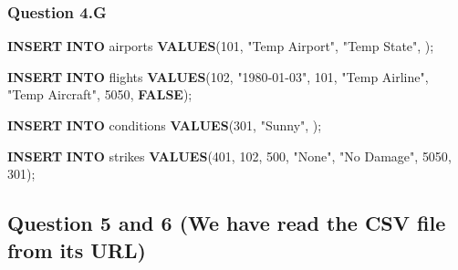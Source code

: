 \documentclass[
]{article}
\newenvironment{Shaded}{\begin{snugshade}}{\end{snugshade}}
\newcommand{\DecValTok}[1]{\textcolor[rgb]{0.00,0.00,0.81}{#1}}
\newcommand{\KeywordTok}[1]{\textcolor[rgb]{0.13,0.29,0.53}{\textbf{#1}}}
\newcommand{\NormalTok}[1]{#1}
\newcommand{\OtherTok}[1]{\textcolor[rgb]{0.56,0.35,0.01}{#1}}
\newcommand{\StringTok}[1]{\textcolor[rgb]{0.31,0.60,0.02}{#1}}
\begin{document}
\hypertarget{question-4.g}{%
\subsubsection{Question 4.G}\label{question-4.g}}

\begin{Shaded}
\begin{Highlighting}[]
  \KeywordTok{INSERT} \KeywordTok{INTO}\NormalTok{ airports }\KeywordTok{VALUES}\NormalTok{(}\DecValTok{101}\NormalTok{, }\OtherTok{"Temp Airport"}\NormalTok{, }\OtherTok{"Temp State"}\NormalTok{, }\StringTok{\textquotesingle{}\textquotesingle{}}\NormalTok{);}
\end{Highlighting}
\end{Shaded}

\begin{Shaded}
\begin{Highlighting}[]
  \KeywordTok{INSERT} \KeywordTok{INTO}\NormalTok{ flights }\KeywordTok{VALUES}\NormalTok{(}\DecValTok{102}\NormalTok{, }\OtherTok{"1980{-}01{-}03"}\NormalTok{, }\DecValTok{101}\NormalTok{, }\OtherTok{"Temp Airline"}\NormalTok{, }\OtherTok{"Temp Aircraft"}\NormalTok{, }\DecValTok{5050}\NormalTok{, }\KeywordTok{FALSE}\NormalTok{);}
\end{Highlighting}
\end{Shaded}

\begin{Shaded}
\begin{Highlighting}[]
  \KeywordTok{INSERT} \KeywordTok{INTO}\NormalTok{ conditions }\KeywordTok{VALUES}\NormalTok{(}\DecValTok{301}\NormalTok{, }\OtherTok{"Sunny"}\NormalTok{, }\StringTok{\textquotesingle{}\textquotesingle{}}\NormalTok{);}
\end{Highlighting}
\end{Shaded}

\begin{Shaded}
\begin{Highlighting}[]
  \KeywordTok{INSERT} \KeywordTok{INTO}\NormalTok{ strikes }\KeywordTok{VALUES}\NormalTok{(}\DecValTok{401}\NormalTok{, }\DecValTok{102}\NormalTok{, }\DecValTok{500}\NormalTok{, }\OtherTok{"None"}\NormalTok{, }\OtherTok{"No Damage"}\NormalTok{, }\DecValTok{5050}\NormalTok{, }\DecValTok{301}\NormalTok{);}
\end{Highlighting}
\end{Shaded}

\hypertarget{question-5-and-6-we-have-read-the-csv-file-from-its-url}{%
\subsection{Question 5 and 6 (We have read the CSV file from its
URL)}\label{question-5-and-6-we-have-read-the-csv-file-from-its-url}}
\end{document}
